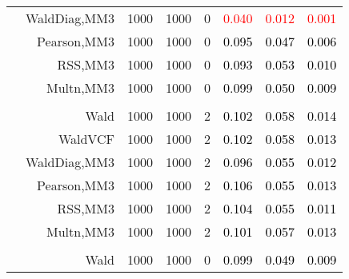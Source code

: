 \documentclass[
]{article}
\begin{document}
\begin{table}[H]
{\begin{tabular}[t]{lrrrrrrr}
\hspace{1em} & WaldDiag,MM3 & 1000 & 1000 & 0 & \textcolor{red}{0.040} & \textcolor{red}{0.012} & \textcolor{red}{0.001}\\

\hspace{1em} & Pearson,MM3 & 1000 & 1000 & 0 & \textcolor{black}{0.095} & \textcolor{black}{0.047} & \textcolor{black}{0.006}\\

\hspace{1em} & RSS,MM3 & 1000 & 1000 & 0 & \textcolor{black}{0.093} & \textcolor{black}{0.053} & \textcolor{black}{0.010}\\

\hspace{1em} & Multn,MM3 & 1000 & 1000 & 0 & \textcolor{black}{0.099} & \textcolor{black}{0.050} & \textcolor{black}{0.009}\\
\cmidrule{1-8}
\addlinespace[0.3em]
\multicolumn{8}{l}{\textbf{1F 15V}}\\
\hspace{1em} & Wald & 1000 & 1000 & 2 & \textcolor{black}{0.102} & \textcolor{black}{0.058} & \textcolor{black}{0.014}\\

\hspace{1em} & WaldVCF & 1000 & 1000 & 2 & \textcolor{black}{0.102} & \textcolor{black}{0.058} & \textcolor{black}{0.013}\\

\hspace{1em} & WaldDiag,MM3 & 1000 & 1000 & 2 & \textcolor{black}{0.096} & \textcolor{black}{0.055} & \textcolor{black}{0.012}\\

\hspace{1em} & Pearson,MM3 & 1000 & 1000 & 2 & \textcolor{black}{0.106} & \textcolor{black}{0.055} & \textcolor{black}{0.013}\\

 & RSS,MM3 & 1000 & 1000 & 2 & \textcolor{black}{0.104} & \textcolor{black}{0.055} & \textcolor{black}{0.011}\\

\hspace{1em} & Multn,MM3 & 1000 & 1000 & 2 & \textcolor{black}{0.101} & \textcolor{black}{0.057} & \textcolor{black}{0.013}\\
\cmidrule{1-8}
\addlinespace[0.3em]
\multicolumn{8}{l}{\textbf{2F 10V}}\\
\hspace{1em} & Wald & 1000 & 1000 & 0 & \textcolor{black}{0.099} & \textcolor{black}{0.049} & \textcolor{black}{0.009}\\


\end{tabular}}
\end{table}
\end{document}
